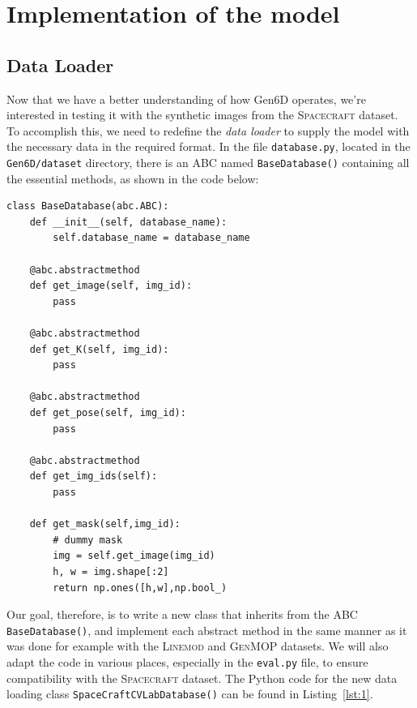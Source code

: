 
\chapter{Implementation of the model}\label{chapter:implementation_of_the_model}

\section{Data Loader}

Now that we have a better understanding of how Gen6D operates, we're interested in testing it with the synthetic images from the \textsc{Spacecraft} dataset. To accomplish this, we need to redefine the \textit{data loader} to supply the model with the necessary data in the required format. In the file \texttt{database.py}, located in the \texttt{Gen6D/dataset} directory, there is an \ac{ABC} named \texttt{BaseDatabase()} containing all the essential methods, as shown in the code below:

\bigbreak

\begin{lstlisting}[style=pythonstyle, label=lst:0, caption={Python code of \ac{ABC} \texttt{BaseDatabase()}, from file \texttt{database.py}.}]
	class BaseDatabase(abc.ABC):
    def __init__(self, database_name):
        self.database_name = database_name

    @abc.abstractmethod
    def get_image(self, img_id):
        pass

    @abc.abstractmethod
    def get_K(self, img_id):
        pass

    @abc.abstractmethod
    def get_pose(self, img_id):
        pass

    @abc.abstractmethod
    def get_img_ids(self):
        pass

    def get_mask(self,img_id):
        # dummy mask
        img = self.get_image(img_id)
        h, w = img.shape[:2]
        return np.ones([h,w],np.bool_)
\end{lstlisting}

\bigbreak

Our goal, therefore, is to write a new class that inherits from the \ac{ABC} \\\texttt{BaseDatabase()}, and implement each abstract method in the same manner as it was done for example with the \textsc{Linemod} and \textsc{GenMOP} datasets. We will also adapt the code in various places, especially in the \texttt{eval.py} file, to ensure compatibility with the \textsc{Spacecraft} dataset. The Python code for the new data loading class \texttt{SpaceCraftCVLabDatabase()} can be found in Listing~\ref{lst:1}.

